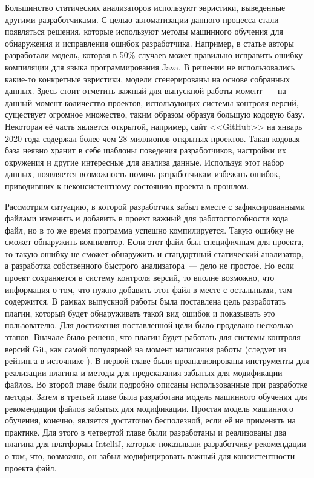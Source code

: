 Большинство статических анализаторов используют эвристики, выведенные другими разработчиками. С целью автоматизации данного процесса стали появляться решения, которые используют методы машинного обучения для обнаружения и исправления ошибок разработчика. Например, в статье \cite{static-analysis-ml} авторы разработали модель, которая в 50\% случаев может правильно исправить ошибку компиляции для языка программирования Java. В решении не использовались какие-то конкретные эвристики, модели сгенерированы на основе собранных данных. Здесь стоит отметить важный для выпускной работы момент~--- на данный момент количество проектов, использующих системы контроля версий, существует огромное множество, таким образом образуя большую кодовую базу. Некоторая её часть является открытой, например, сайт <<GitHub>> на январь 2020 года содержал более чем 28 миллионов открытых проектов. Такая кодовая база неявно хранит в себе шаблоны поведения разработчиков, настройки их окружения и другие интересные для анализа данные. Используя этот набор данных, появляется возможность помочь разработчикам избежать ошибок, приводивших к неконсистентному состоянию проекта в прошлом.

Рассмотрим ситуацию, в которой разработчик забыл вместе с зафиксированными файлами изменить и добавить в проект важный для работоспособности кода файл, но в то же время программа успешно компилируется. Такую ошибку не сможет обнаружить компилятор. Если этот файл был специфичным для проекта, то такую ошибку не сможет обнаружить и стандартный статический анализатор, а разработка собственного быстрого анализатора~--- дело не простое. Но если проект сохраняется в систему контроля версий, то вполне возможно, что информация о том, что нужно добавить этот файл в месте с остальными, там содержится. В рамках выпускной работы была поставлена цель разработать плагин, который будет обнаруживать такой вид ошибок и показывать это пользователю. Для достижения поставленной цели было проделано несколько этапов. Вначале было решено, что плагин будет работать для системы контроля версий Git, как самой популярной на момент написания работы (следует из рейтинга в источнике \cite{best-vcs}). В первой главе были проанализированы инструменты для реализации плагина и методы для предсказания забытых для модификации файлов. Во второй главе были подробно описаны использованные при разработке методы. Затем в третьей главе была разработана модель машинного обучения для рекомендации файлов забытых для модификации. Простая модель машинного обучения, конечно, является достаточно бесполезной, если её не применять на практике. Для этого в четвертой главе были разработаны и реализованы два плагина для платформы IntelliJ, которые показывали разработчику рекомендации о том, что, возможно, он забыл модифицировать важный для консистентности проекта файл.